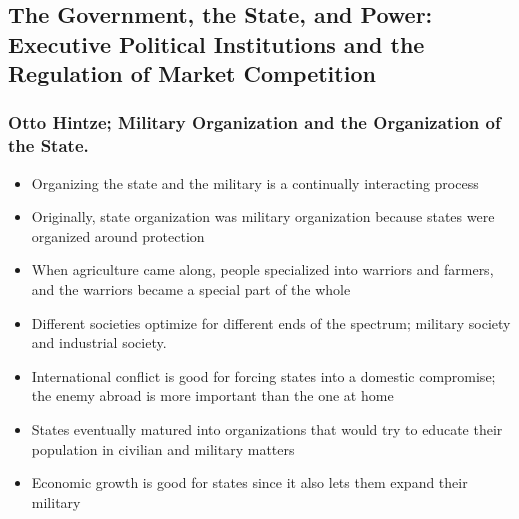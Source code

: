 \documentclass[11pt]{article}
\begin{document}
\subsection{The Government, the State, and Power: Executive Political Institutions and the Regulation of Market Competition}
\label{sec:org126304d}
\subsubsection{Otto Hintze; Military Organization and the Organization of the State.}
\label{sec:org3827750}
\begin{itemize}
\item Organizing the state and the military is a continually interacting process
\item Originally, state organization was military organization because states were
organized around protection
\item When agriculture came along, people specialized into warriors and farmers, and
the warriors became a special part of the whole
\item Different societies optimize for different ends of the spectrum; military
society and industrial society.
\item International conflict is good for forcing states into a domestic compromise;
the enemy abroad is more important than the one at home
\item States eventually matured into organizations that would try to educate their
population in civilian and military matters
\item Economic growth is good for states since it also lets them expand their military
\end{itemize}
\end{document}
